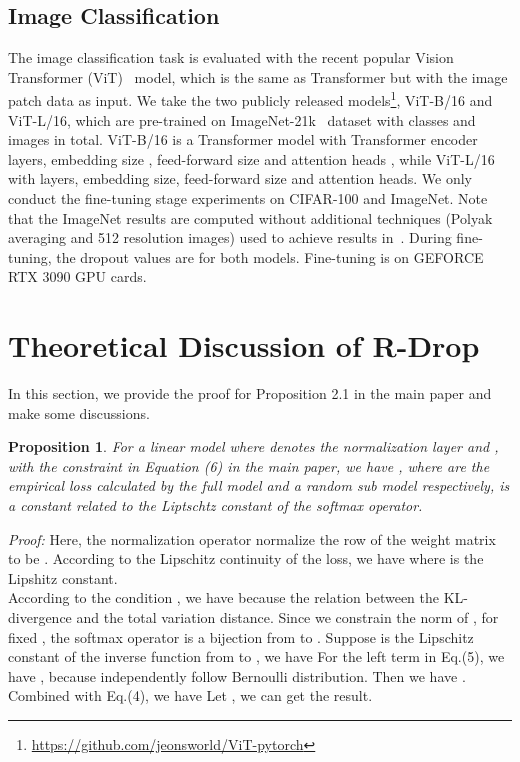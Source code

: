 \documentclass{article}
\newtheorem{proposition}[theorem]{Proposition}
\begin{document}
\subsection{Image Classification}
The image classification task is evaluated with the recent popular Vision Transformer (ViT)~\cite{dosovitskiy2021an} model, which is the same as Transformer but with the image patch data as input. We take the two publicly released models\footnote{\url{https://github.com/jeonsworld/ViT-pytorch}}, ViT-B/16 and ViT-L/16, which are pre-trained on ImageNet-21k~\cite{deng2009imagenet} dataset with  classes and  images in total. ViT-B/16 is a Transformer model with  Transformer encoder layers, embedding size , feed-forward size  and attention heads , while ViT-L/16 with  layers,  embedding size,  feed-forward size and  attention heads. We only conduct the fine-tuning stage experiments on CIFAR-100 and ImageNet. Note that the ImageNet results are computed without additional techniques (Polyak averaging and 512 resolution images) used to achieve results in~\cite{dosovitskiy2021an}. During fine-tuning, the dropout values are  for both models. Fine-tuning is on  GEFORCE RTX 3090 GPU cards.

\section{Theoretical Discussion of R-Drop}
\label{sec:theory_appendix}
In this section, we provide the proof for Proposition 2.1 in the main paper and make some discussions.
\begin{proposition}
	For a linear model  where  denotes the normalization layer and , with the constraint in Equation (6) in the main paper, we have , where  are the empirical loss calculated by the full model and a random sub model respectively,  is a constant related to the Liptschtz constant of the softmax operator.
\end{proposition}
\textit{Proof:} Here, the normalization operator normalize the row of the weight matrix  to be .  
According to the Lipschitz continuity of the loss, we have
where  is the Lipshitz constant.\\
According to the condition  , we have
because the relation between the KL-divergence and the total variation distance. Since we constrain the norm of , for fixed , the softmax operator is a bijection from  to . Suppose  is the Lipschitz constant of the inverse function from  to , we have
For the left term in Eq.(5), we have
, because  independently follow Bernoulli distribution.  Then we have . Combined with Eq.(4), we have 
Let , we can get the result.
\end{document}
